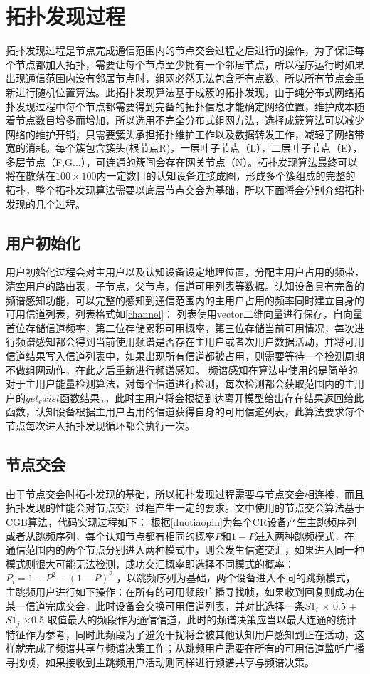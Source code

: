 \documentclass[a4paper,AutoFakeBold,oneside,12pt]{book}
\begin{document}
 \section{拓扑发现过程}
 拓扑发现过程是节点完成通信范围内的节点交会过程之后进行的操作，为了保证每个节点都加入拓扑，需要让每个节点至少拥有一个邻居节点，所以程序运行时如果出现通信范围内没有邻居节点时，组网必然无法包含所有点数，所以所有节点会重新进行随机位置算法。此拓扑发现算法基于成簇的拓扑发现，由于纯分布式网络拓扑发现过程中每个节点都需要得到完备的拓扑信息才能确定网络位置，维护成本随着节点数目增多而增加，所以选用不完全分布式组网方法，选择成簇算法可以减少网络的维护开销，只需要簇头承担拓扑维护工作以及数据转发工作，减轻了网络带宽的消耗。每个簇包含簇头(根节点R)，一层叶子节点（L），二层叶子节点（E），多层节点（F,G...），可连通的簇间会存在网关节点（N）。拓扑发现算法最终可以将在散落在$100\times 100$内一定数目的认知设备连接成图，形成多个簇组成的完整的拓扑，整个拓扑发现算法需要以底层节点交会为基础，所以下面将会分别介绍拓扑发现的几个过程。
 \subsection{用户初始化}
 用户初始化过程会对主用户以及认知设备设定地理位置，分配主用户占用的频带，清空用户的路由表，子节点，父节点，信道可用列表等数据。认知设备具有完备的频谱感知功能，可以完整的感知到通信范围内的主用户占用的频率同时建立自身的可用信道列表，列表格式如\ref{channel}：
 列表使用vector二维向量进行保存，自向量首位存储信道频率，第二位存储累积可用概率，第三位存储当前可用情况，每次进行频谱感知都会得到当前使用频谱是否存在主用户或者次用户数据活动，并将可用信道结果写入信道列表中，如果出现所有信道都被占用，则需要等待一个检测周期不做组网动作，在此之后重新进行频谱感知。
  频谱感知在算法中使用的是简单的对于主用户能量检测算法，对每个信道进行检测，每次检测都会获取范围内的主用户的$get_exist$函数结果，，此时主用户将会根据到达离开模型给出存在结果返回给此函数，认知设备根据主用户占用的信道获得自身的可用信道列表，此算法要求每个节点每次进入拓扑发现循环都会执行一次。
 \subsection{节点交会}
 由于节点交会时拓扑发现的基础，所以拓扑发现过程需要与节点交会相连接，而且拓扑发现的性能会对节点交汇过程产生一定的要求。文中使用的节点交会算法基于CGB算法，代码实现过程如下：
 根据\ref{duotiaopin}为每个CR设备产生主跳频序列或者从跳频序列，每个认知节点都有相同的概率$P$和$1-P$进入两种跳频模式，在通信范围内的两个节点分别进入两种模式中，则会发生信道交汇，如果进入同一种模式则很大可能无法检测，成功交汇概率即选择不同模式的概率：$P_i=1-P^2-(1-P)^2$
，以跳频序列为基础，两个设备进入不同的跳频模式，主跳频用户进行如下操作：在所有的可用频段广播寻找帧，如果收到回复则成功在某一信道完成交会，此时设备会交换可用信道列表，并对比选择一条$S1_i$ $\times$ 0.5 +$S1_j$ $ \times $0.5 取值最大的频段作为通信信道，此时的频谱决策应当以最大连通的统计特征作为参考，同时此频段为了避免干扰将会被其他认知用户感知到正在活动，这样就完成了频谱共享与频谱决策工作；从跳频用户需要在所有的可用信道监听广播寻找帧，如果接收到主跳频用户活动则同样进行频谱共享与频谱决策。
  
\end{document}
